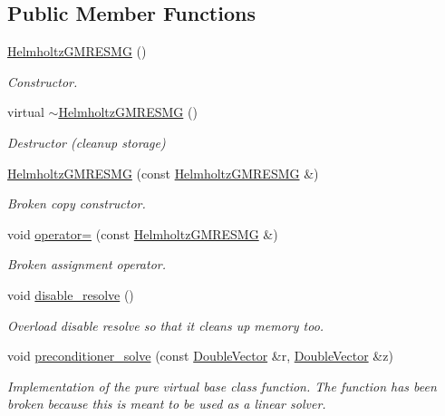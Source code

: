 \subsection*{Public Member Functions}
\begin{DoxyCompactItemize}
\item 
\hyperlink{classoomph_1_1HelmholtzGMRESMG_ab686680821fe3c9ac0c0a07ccb0e7550}{Helmholtz\+G\+M\+R\+E\+S\+MG} ()
\begin{DoxyCompactList}\small\item\em Constructor. \end{DoxyCompactList}\item 
virtual \hyperlink{classoomph_1_1HelmholtzGMRESMG_aa8bdb804033f8050742706589cd8a072}{$\sim$\+Helmholtz\+G\+M\+R\+E\+S\+MG} ()
\begin{DoxyCompactList}\small\item\em Destructor (cleanup storage) \end{DoxyCompactList}\item 
\hyperlink{classoomph_1_1HelmholtzGMRESMG_aa1e9e5ec373b7dd34787f84f5b518987}{Helmholtz\+G\+M\+R\+E\+S\+MG} (const \hyperlink{classoomph_1_1HelmholtzGMRESMG}{Helmholtz\+G\+M\+R\+E\+S\+MG} \&)
\begin{DoxyCompactList}\small\item\em Broken copy constructor. \end{DoxyCompactList}\item 
void \hyperlink{classoomph_1_1HelmholtzGMRESMG_ae304723f85ff9f174b020969fdf66e60}{operator=} (const \hyperlink{classoomph_1_1HelmholtzGMRESMG}{Helmholtz\+G\+M\+R\+E\+S\+MG} \&)
\begin{DoxyCompactList}\small\item\em Broken assignment operator. \end{DoxyCompactList}\item 
void \hyperlink{classoomph_1_1HelmholtzGMRESMG_a842b638722cd45650da8771aea2f9e5c}{disable\+\_\+resolve} ()
\begin{DoxyCompactList}\small\item\em Overload disable resolve so that it cleans up memory too. \end{DoxyCompactList}\item 
void \hyperlink{classoomph_1_1HelmholtzGMRESMG_a6050720b0d12f422e4b2983378dc53e5}{preconditioner\+\_\+solve} (const \hyperlink{classoomph_1_1DoubleVector}{Double\+Vector} \&r, \hyperlink{classoomph_1_1DoubleVector}{Double\+Vector} \&z)
\begin{DoxyCompactList}\small\item\em Implementation of the pure virtual base class function. The function has been broken because this is meant to be used as a linear solver. \end{DoxyCompactList}\item 

\end{DoxyCompactItemize}
